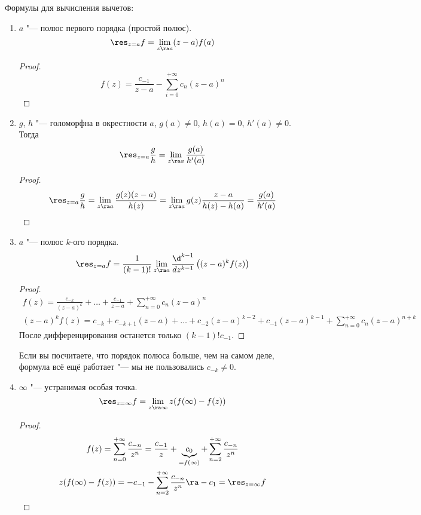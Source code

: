 Формулы для вычисления вычетов:
\begin{enumerate}
\item
	$a$ "--- полюс первого порядка (простой полюс).
	\[ \res_{z=a} f = \lim_{z\ra a} (z - a) f(a) \]
	\begin{proof}
		\[ f(z) = \frac{c_{-1}}{z-a} - \sum_{i=0}^{+\infty} c_n (z-a)^n\]
	\end{proof}

\item
	$g$, $h$ "--- голоморфна в окрестности $a$, $g(a) \ne 0$, $h(a) = 0$, $h'(a) \ne 0$.
	Тогда
	\[ \res_{z=a} \frac gh = \lim_{z\ra a} \frac{g(a)}{h'(a)} \]
	\begin{proof}
		\[
			\res_{z=a} \frac gh
			= \lim_{z\ra a} \frac{g(z)(z - a)}{h(z)}
			= \lim_{z \ra a} g(z) \frac{z - a}{h(z) - h(a)}
			= \frac{g(a)}{h'(a)}
		\]
	\end{proof}

\item
	$a$ "--- полюс $k$-ого порядка.
	\[ \res_{z=a} f = \frac1{(k-1)!} \lim_{z\ra a} \frac{\d^{k-1}}{d z^{k-1}} \left( (z-a)^k f(z) \right) \]
	\begin{proof}
		\begin{gather*}
			f(z)
			= \frac{c_{-k}}{(z-a)^k} + \dots + \frac{c_{-1}}{z-a} + \sum_{n=0}^{+\infty} c_n(z-a)^n \\
			(z-a)^k f(z) = c_{-k} + c_{-k+1}(z-a) + \dots + c_{-2} (z-a)^{k-2} + c_{-1} (z-a)^{k-1} + \sum_{n=0}^{+\infty} c_n (z-a)^{n+k}
		\end{gather*}
		После дифференцирования останется только $(k-1)! c_{-1}$.
	\end{proof}
	\begin{Rem}
		Если вы посчитаете, что порядок полюса больше, чем на самом деле, формула всё ещё работает "--- мы не пользовались $c_{-k} \ne 0$.
	\end{Rem}

\item
	$\infty$ "--- устранимая особая точка.
	\[ \res_{z=\infty} f = \lim_{z\ra\infty} z(f(\infty) - f(z)) \]
	\begin{proof}
		\begin{gather*}
			f(z)
			= \sum_{n=0}^{+\infty} \frac{c_{-n}}{z^n} = \frac{c_{-1}}z + \underbrace{c_0}_{=f(\infty)} + \sum_{n=2}^{+\infty} \frac{c_{-n}}{z^n} \\
			z(f(\infty) - f(z)) = -c_{-1} - \sum_{n=2}^{+\infty} \frac{c_{-n}}{z^n} \ra -c_1 = \res_{z=\infty} f
		\end{gather*}
	\end{proof}


\end{enumerate}
